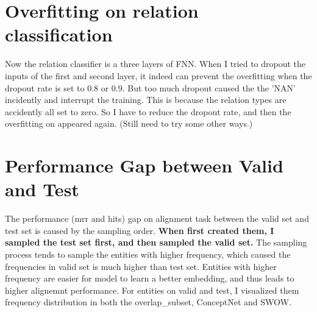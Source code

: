 \section{Overfitting on relation classification}
Now the relation classifier is a three layers of FNN. 
When I tried to dropout the inputs of the first and second layer, it indeed can prevent the overfitting when the dropout rate is set to 0.8 or 0.9. But too much dropout caused the the 'NAN' incidently and interrupt the training. This is because the relation types are accidently all set to zero.
So I have to reduce the dropout rate, and then the overfitting on appeared again. (Still need to try some other ways.)

\section{Performance Gap between Valid and Test}
The performance (mrr and hits) gap on alignment task between the valid set and test set is caused by the sampling order. \textbf{When first created them, I sampled the test set first, and then sampled the valid set.} The sampling process tends to sample the entities with higher frequency, which caused the frequencies in valid set is much higher than test set. Entities with higher frequency are easier for model to learn a better embedding, and thus leads to higher alignemnt performance. 
For entities on valid and test, I visualized them frequency distribution in both the overlap\_subset, ConceptNet and SWOW. 


